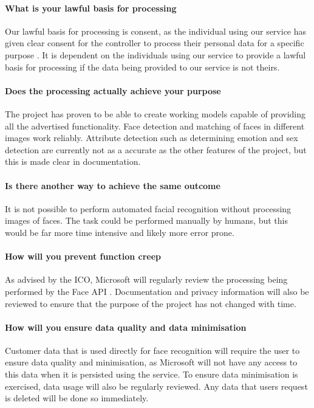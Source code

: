\documentclass[12pt]{extarticle}
\begin{document}
\paragraph{What is your lawful basis for processing}
Our lawful basis for processing is consent, as the individual using our service has given clear consent for the controller to process their personal data for a specific purpose \cite{icolawfulbasis}.
It is dependent on the individuals using our service to provide a lawful basis for processing if the data being provided to our service is not theirs.

\paragraph{Does the processing actually achieve your purpose}
The project has proven to be able to create working models capable of providing all the advertised functionality.
Face detection and matching of faces in different images work reliably.
Attribute detection such as determining emotion and sex detection are currently not as a accurate as the other features of the project, but this is made clear in documentation.

\paragraph{Is there another way to achieve the same outcome}
It is not possible to perform automated facial recognition without processing images of faces.
The task could be performed manually by humans, but this would be far more time intensive and likely more error prone.

\paragraph{How will you prevent function creep}
As advised by the ICO, Microsoft will regularly review the processing being performed by the Face API \cite{featurecreep}. 
Documentation and privacy information will also be reviewed to ensure that the purpose of the project has not changed with time.

\paragraph{How will you ensure data quality and data minimisation}
Customer data that is used directly for face recognition will require the user to ensure data quality and minimisation, as Microsoft will not have any access to this data when it is persisted using the service.
To ensure data minimisation is exercised, data usage will also be regularly reviewed. 
Any data that users request is deleted will be done so immediately.
\end{document}
